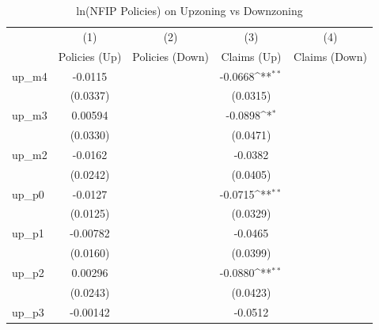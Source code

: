 \begin{table}[htbp]\centering
\def\sym#1{\ifmmode^{#1}\else\(^{#1}\)\fi}
\caption{ln(NFIP Policies) on Upzoning vs Downzoning}
\begin{tabular}{l*{4}{c}}
\hline\hline
                    &\multicolumn{1}{c}{(1)}&\multicolumn{1}{c}{(2)}&\multicolumn{1}{c}{(3)}&\multicolumn{1}{c}{(4)}\\
                    &\multicolumn{1}{c}{Policies (Up)}&\multicolumn{1}{c}{Policies (Down)}&\multicolumn{1}{c}{Claims (Up)}&\multicolumn{1}{c}{Claims (Down)}\\
\hline
up\_m4               &     -0.0115         &                     &     -0.0668\sym{**} &                     \\
                    &    (0.0337)         &                     &    (0.0315)         &                     \\
[1em]
up\_m3               &     0.00594         &                     &     -0.0898\sym{*}  &                     \\
                    &    (0.0330)         &                     &    (0.0471)         &                     \\
[1em]
up\_m2               &     -0.0162         &                     &     -0.0382         &                     \\
                    &    (0.0242)         &                     &    (0.0405)         &                     \\
[1em]
up\_p0               &     -0.0127         &                     &     -0.0715\sym{**} &                     \\
                    &    (0.0125)         &                     &    (0.0329)         &                     \\
[1em]
up\_p1               &    -0.00782         &                     &     -0.0465         &                     \\
                    &    (0.0160)         &                     &    (0.0399)         &                     \\
[1em]
up\_p2               &     0.00296         &                     &     -0.0880\sym{**} &                     \\
                    &    (0.0243)         &                     &    (0.0423)         &                     \\
[1em]
up\_p3               &    -0.00142         &                     &     -0.0512         &                     \\

\end{tabular}
\end{table}
